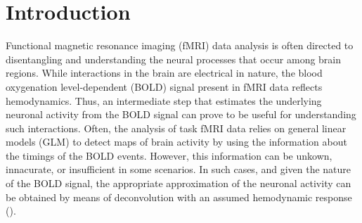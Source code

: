 
\section{Introduction}








Functional magnetic resonance imaging (fMRI) data analysis is often directed to disentangling and understanding the neural processes that occur among brain regions. While interactions in the brain are electrical in nature, the blood oxygenation level-dependent (BOLD) signal present in fMRI data reflects hemodynamics. Thus, an intermediate step that estimates the underlying neuronal activity from the BOLD signal can prove to be useful for understanding such interactions. Often, the analysis of task fMRI data relies on general linear models (GLM) to detect maps of brain activity by using the information about the timings of the BOLD events. However, this information can be unkown, innacurate, or insufficient in some scenarios. In such cases, and given the nature of the BOLD signal, the appropriate approximation of the neuronal activity can be obtained by means of deconvolution with an assumed hemodynamic response (\citealt{gitelman2003ModelingRegionalPsychophysiologic}).

